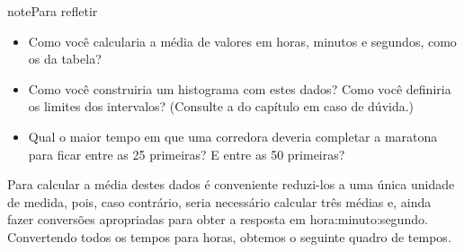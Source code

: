 \begin{sphinxadmonition}{note}{Para refletir}
\begin{itemize}
\item {} 
Como você calcularia a média de valores em horas, minutos e segundos,  como os da tabela?

\item {} 
Como você construiria um histograma com estes dados? Como você definiria os limites dos intervalos? (Consulte a  do capítulo  em caso de dúvida.)

\item {} 
Qual o maior tempo em que uma corredora deveria completar a maratona para ficar entre as 25 primeiras? E entre as 50 primeiras?

\end{itemize}

Para calcular a média destes dados é conveniente reduzi-los a uma única unidade de medida, pois, caso contrário, seria necessário calcular três médias e, ainda fazer conversões apropriadas para obter a resposta em hora:minuto:segundo. Convertendo todos os tempos para horas, obtemos o seguinte quadro de tempos.



\end{sphinxadmonition}
